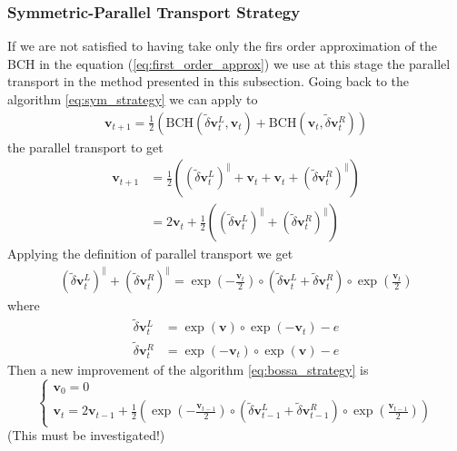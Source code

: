 \subsubsection{Symmetric-Parallel Transport Strategy}
If we are not satisfied to having take only the firs order approximation of the BCH in the equation (\ref{eq:first_order_approx}) we use at this stage the parallel transport in the method presented in this subsection.
Going back to the algorithm \ref{eq:sym_strategy} we can apply to
\begin{align*}
\mathbf{v}_{t+1} = \frac{1}{2}(\text{BCH}(\tilde{\delta} \mathbf{v}^{L}_{t}, \mathbf{v}_{t}) + \text{BCH}(\mathbf{v}_{t},\tilde{\delta} \mathbf{v}^{R}_{t}))
\end{align*}
the parallel transport to get
\begin{align*}
\mathbf{v}_{t+1} &= \frac{1}{2}((\tilde{\delta} \mathbf{v}^{L}_{t})^{\parallel} + \mathbf{v}_{t} + \mathbf{v}_{t} + (\tilde{\delta} \mathbf{v}^{R}_{t})^{\parallel}) \\
&= 2\mathbf{v}_{t} + \frac{1}{2}((\tilde{\delta} \mathbf{v}^{L}_{t})^{\parallel} + (\tilde{\delta} \mathbf{v}^{R}_{t})^{\parallel})
\end{align*}
Applying the definition of parallel transport we get
\begin{align*}
(\tilde{\delta} \mathbf{v}^{L}_{t})^{\parallel} + (\tilde{\delta} \mathbf{v}^{R}_{t})^{\parallel} 
= 
\exp(-\frac{\mathbf{v}_{t}}{2}) \circ (\tilde{\delta} \mathbf{v}^{L}_{t} +\tilde{\delta} \mathbf{v}^{R}_{t} )\circ \exp(\frac{\mathbf{v}_{t}}{2})
\end{align*}
where 
\begin{align*}
\tilde{\delta} \mathbf{v}^{L}_{t} &=  \exp(\mathbf{v})\circ \exp(-\mathbf{v}_{t}) - e \\
\tilde{\delta} \mathbf{v}^{R}_{t} &=  \exp(-\mathbf{v}_{t})\circ \exp(\mathbf{v}) - e
\end{align*}
Then a new improvement of the algorithm \ref{eq:bossa_strategy}  is
\begin{equation}\label{eq:sym_parallel_strategy}
\begin{cases}
\mathbf{v}_0 = 0 \\
\mathbf{v}_{t} 
=  
2\mathbf{v}_{t-1} + \frac{1}{2}(\exp(-\frac{\mathbf{v}_{t-1}}{2}) 
\circ 
(\tilde{\delta} \mathbf{v}^{L}_{t-1} +\tilde{\delta} \mathbf{v}^{R}_{t-1} )\circ \exp(\frac{\mathbf{v}_{t-1}}{2}))
\end{cases}
\end{equation}
(This must be investigated!)






